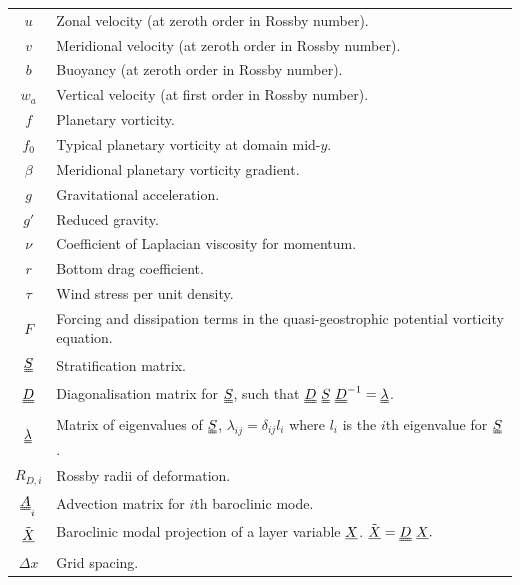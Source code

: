 \documentclass[a4paper]{book}
\begin{document}
\begin{center}
\begin{longtable}{ | c | p{} | }
  $u$                  & Zonal velocity (at zeroth order in Rossby number). \\
  $v$                  & Meridional velocity (at zeroth order in Rossby
                         number). \\
  $b$                  & Buoyancy (at zeroth order in Rossby number). \\
  $w_a$                & Vertical velocity (at first order in Rossby
                         number). \\
  \hline
  $f$                  & Planetary vorticity. \\
  $f_0$                & Typical planetary vorticity at domain mid-$y$. \\
  $\beta$              & Meridional planetary vorticity gradient. \\
  $g$                  & Gravitational acceleration. \\
  $g'$                 & Reduced gravity. \\
  $\nu$                & Coefficient of Laplacian viscosity for momentum. \\
  $r$                  & Bottom drag coefficient. \\
  $\tau$               & Wind stress per unit density. \\
  $F$                  & Forcing and dissipation terms in the quasi-geostrophic
                         potential vorticity equation. \\
  \hline
  $\uuline{S}$         & Stratification matrix. \\
  $\uuline{D}$         & Diagonalisation matrix for $\uuline{S}$, such that
                         $\uuline{D}~\uuline{S}~\uuline{D}^{-1} =
                         \uuline{\lambda}$. \\
  $\uuline{\lambda}$   & Matrix of eigenvalues of $\uuline{S}$,
                         $\lambda_{ij} = \delta_{ij} l_i$ where $l_i$
                         is the $i$th eigenvalue for $\uuline{S}$. \\
  $R_{D,i}$            & Rossby radii of deformation. \\
  $\uuline{A}_i$       & Advection matrix for $i$th baroclinic mode. \\
  $\tilde{\uline{X}}$  & Baroclinic modal projection of a layer variable
                         $\uline{X}$. $\tilde{\uline{X}} =
                         \uuline{D}~\uline{X}.$ \\
  \hline
  $\Delta x$           & Grid spacing. \\

\end{longtable}
\end{center}
\end{document}

